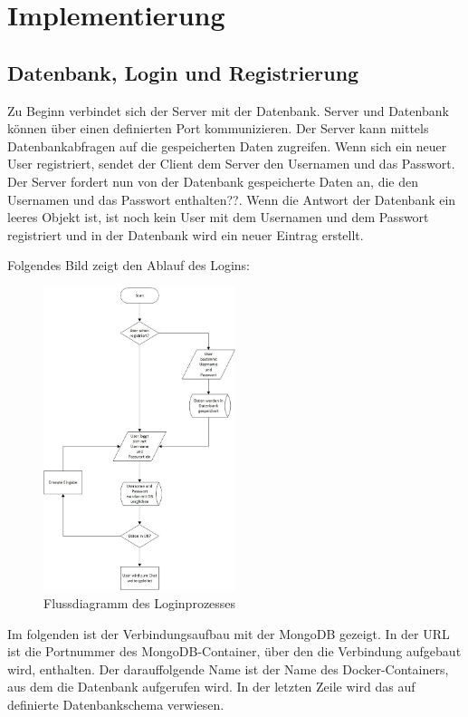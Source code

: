 
\chapter{Implementierung}\label{cha:Implementierung}
\section{Datenbank, Login und Registrierung}\label{Datenbank}
Zu Beginn verbindet sich der Server mit der Datenbank. Server und Datenbank können über einen definierten Port kommunizieren. Der Server kann mittels Datenbankabfragen auf die gespeicherten Daten zugreifen. Wenn sich ein neuer User registriert, sendet der Client dem Server den Usernamen und das Passwort. Der Server fordert nun von der Datenbank gespeicherte Daten an, die den Usernamen und das Passwort enthalten??. Wenn die Antwort der Datenbank ein leeres Objekt ist, ist noch kein User mit dem Usernamen und dem Passwort registriert und in der Datenbank wird ein neuer Eintrag erstellt. 

Folgendes Bild zeigt den Ablauf des Logins:
\begin{figure}[H]
\centering
\includegraphics[width=0.5\textwidth]{images/login.jpg}
\caption{Flussdiagramm des Loginprozesses}
\end{figure}

Im folgenden ist der Verbindungsaufbau mit der MongoDB gezeigt. In der URL ist die Portnummer des MongoDB-Container, über den die Verbindung aufgebaut wird, enthalten. Der darauffolgende Name ist der Name des Docker-Containers, aus dem die Datenbank aufgerufen wird.
In der letzten Zeile wird das auf definierte Datenbankschema verwiesen. 

